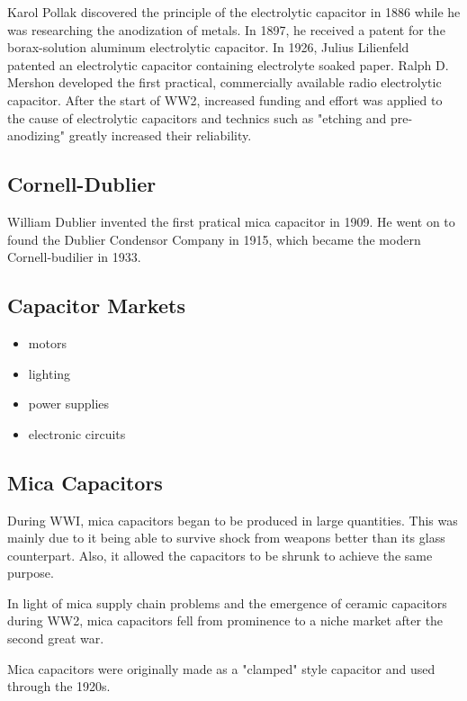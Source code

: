 Karol Pollak discovered the principle of the electrolytic capacitor in 1886 while he was researching the anodization of metals. In 1897, he received a patent for the borax-solution aluminum electrolytic capacitor. In 1926, Julius Lilienfeld patented an electrolytic capacitor containing electrolyte soaked paper. Ralph D. Mershon developed the first practical, commercially available radio electrolytic capacitor. After the start of WW2, increased funding and effort was applied to the cause of electrolytic capacitors and technics such as "etching and pre-anodizing" greatly increased their reliability. \cite{wiki_elec}



\subsection{Cornell-Dublier}
William Dublier invented the first pratical mica capacitor in 1909. He went on to found the Dublier Condensor Company in 1915, which became the modern Cornell-budilier in 1933.\cite{deis_hist} 

\subsection{Capacitor Markets}
\begin{itemize}
    \item motors
    \item lighting
    \item power supplies
    \item electronic circuits
\end{itemize}
\cite{capRev}

\subsection{Mica Capacitors}
During WWI, mica capacitors began to be produced in large quantities. This was mainly due to it being able to survive shock from weapons better than its glass counterpart. Also, it allowed the capacitors to be shrunk to achieve the same purpose. \cite[f.~37-41]{dumInv}

In light of mica supply chain problems and the emergence of ceramic capacitors during WW2, mica capacitors fell from prominence to a niche market after the second great war.\cite[Ch 3, Sec II]{cerMaterials}

Mica capacitors were originally made as a "clamped" style capacitor and used through the 1920s\cite{wiki_mica}. 

